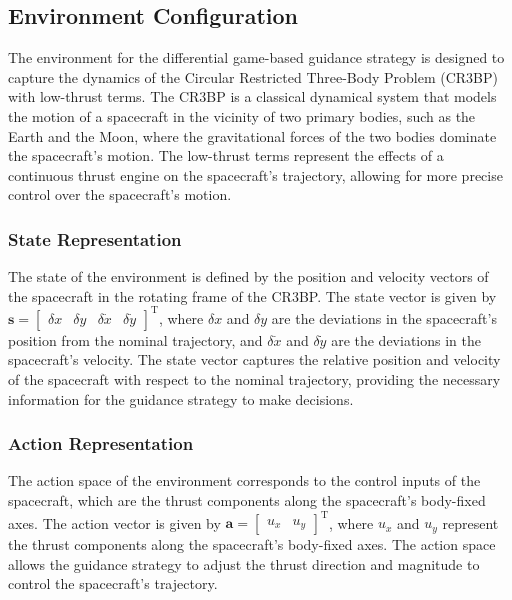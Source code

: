 \documentclass[conference]{IEEEtran}
\begin{document}
\subsection{Environment Configuration}
The environment for the differential game-based guidance strategy is designed to capture the dynamics of the Circular Restricted Three-Body Problem (CR3BP) with low-thrust terms. The CR3BP is a classical dynamical system that models the motion of a spacecraft in the vicinity of two primary bodies, such as the Earth and the Moon, where the gravitational forces of the two bodies dominate the spacecraft's motion. The low-thrust terms represent the effects of a continuous thrust engine on the spacecraft's trajectory, allowing for more precise control over the spacecraft's motion.
\subsubsection{State Representation}
The state of the environment is defined by the position and velocity vectors of the spacecraft in the rotating frame of the CR3BP. The state vector is given by \( \boldsymbol{s} = \begin{bmatrix}
	\delta x & \delta y & \delta \dot{x} & \delta \dot{y}
\end{bmatrix}^\mathrm{T} \), where \( \delta x \) and \( \delta y \) are the deviations in the spacecraft's position from the nominal trajectory, and \( \delta \dot{x} \) and \( \delta \dot{y} \) are the deviations in the spacecraft's velocity. The state vector captures the relative position and velocity of the spacecraft with respect to the nominal trajectory, providing the necessary information for the guidance strategy to make decisions.
\subsubsection{Action Representation}
The action space of the environment corresponds to the control inputs of the spacecraft, which are the thrust components along the spacecraft's body-fixed axes. The action vector is given by \( \boldsymbol{a} = \begin{bmatrix}
	u_x & u_y
\end{bmatrix}^\mathrm{T} \), where \( u_x \) and \( u_y \) represent the thrust components along the spacecraft's body-fixed axes. The action space allows the guidance strategy to adjust the thrust direction and magnitude to control the spacecraft's trajectory.
\end{document}
